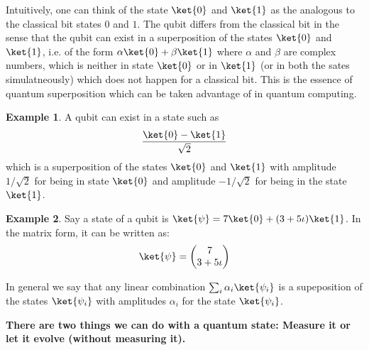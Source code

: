 \documentclass[12pt, oneside]{book}
\theoremstyle{definition}
\theoremstyle{definition}
\newtheorem{example}{Example}[section]
\theoremstyle{remark}
\begin{document}
Intuitively, one can think of the state $\ket{0}$ and $\ket{1}$ as the analogous to the classical bit states $0$ and $1$. 
The qubit differs from the classical bit in the sense that the qubit can exist in a superposition of the states $\ket{0}$ and $\ket{1}$,
i.e. of the form $\alpha\ket{0}+\beta\ket{1}$ where $\alpha$ and $\beta$ are complex numbers, which is neither in state $\ket{0}$ or in $\ket{1}$ (or in both the sates 
simulatneously)  which does not happen for a classical bit. This is the essence of quantum superposition which can be taken advantage of in quantum computing.

\begin{example}
    A qubit can exist in a state such as 
    \[\dfrac{\ket{0}-\ket{1}}{\sqrt{2}}\]
    which is a superposition of the states $\ket{0}$ and $\ket{1}$ with amplitude $1/\sqrt{2}$ for being in state $\ket{0}$ and 
    amplitude $-1/\sqrt{2}$ for being in the state $\ket{1}$.
\end{example}
\begin{example}
    Say a state of a qubit is $\ket{\psi}=7\ket{0}+(3+5\iota)\ket{1}$. In the matrix form, it can be written as:
    \[
        \ket{\psi}=\begin{pmatrix} 7 \\ 3+5\iota \end{pmatrix}
    \]
\end{example}

In general we say that any linear combination $\sum_i \alpha_i \ket{\psi_i}$ is a supeposition of the states $\ket{\psi_i}$ with amplitudes 
$\alpha_i$ for the state $\ket{\psi_i}$.

\textbf{There are two things we can do with a quantum state: Measure it or let it evolve (without measuring it).}
\end{document}
